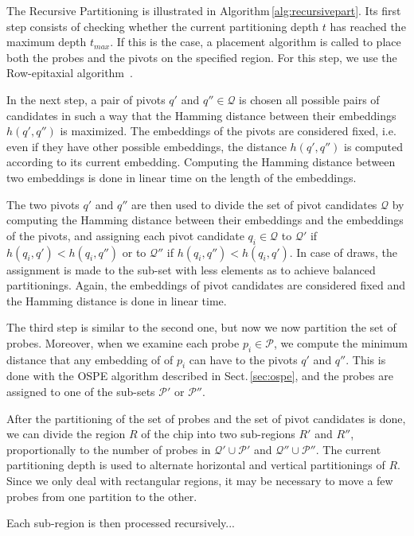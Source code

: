 \documentclass{llncs}
\begin{document}
The Recursive Partitioning is illustrated in Algorithm\,\ref{alg:recursivepart}. Its first
step consists of checking whether the current partitioning depth $t$ has reached the maximum
depth $t_{max}$. If this is the case, a placement algorithm is called to place both the probes
and the pivots on the specified region. For this step, we use the Row-epitaxial
algorithm~\cite{KAHNG03A}.

In the next step, a pair of pivots $q'$ and $q'' \in \mathcal{Q}$ is chosen
all possible pairs of candidates in such a way that the Hamming distance between
their embeddings $h(q', q'')$ is maximized. The embeddings of the pivots are considered fixed,
i.e. even if they have other possible embeddings, the distance $h(q', q'')$ is computed
according to its current embedding. Computing the Hamming distance between two embeddings
is done in linear time on the length of the embeddings.

The two pivots $q'$ and $q''$ are then used to divide the set of pivot candidates $\mathcal{Q}$
by computing the Hamming distance between their embeddings and the embeddings of the pivots, and
assigning each pivot candidate $q_i \in \mathcal{Q}$ to $\mathcal{Q}'$ if
$h(q_i, q') < h(q_i, q'')$ or to $\mathcal{Q}''$ if $h(q_i, q'') < h(q_i, q')$. In case of draws,
the assignment is made to the sub-set with less elements as to achieve balanced partitionings.
Again, the embeddings of pivot candidates are considered fixed and the Hamming distance is done
in linear time.

The third step is similar to the second one, but now we now partition the set of probes.
Moreover, when we examine each probe $p_i \in \mathcal{P}$, we compute the minimum
distance that any embedding of of $p_i$ can have to the pivots $q'$ and $q''$. This is done with
the OSPE algorithm described in Sect.\,\ref{sec:ospe}, and the probes are assigned to one of the
sub-sets $\mathcal{P}'$ or $\mathcal{P}''$.

After the partitioning of the set of probes and the set of pivot candidates is done, we can
divide the region $R$ of the chip into two sub-regions $R'$ and $R''$, proportionally to the
number of probes in $\mathcal{Q}' \cup \mathcal{P}'$ and $\mathcal{Q}'' \cup \mathcal{P}''$.
The current partitioning depth is used to alternate horizontal and vertical partitionings of $R$.
Since we only deal with rectangular regions, it may be necessary to move a few probes
from one partition to the other.

Each sub-region is then processed recursively...
\end{document}
